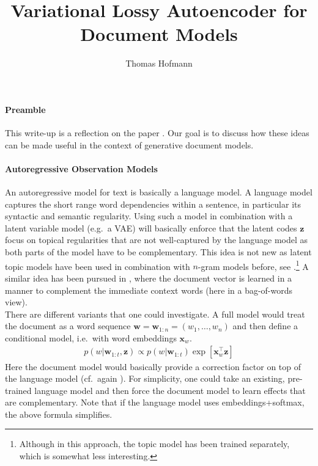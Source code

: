 \documentclass{article}
\title{Variational Lossy Autoencoder for \\ Document Models}
\author{Thomas Hofmann}
\newcommand{\z}{{\mathbf z}}
\newcommand{\x}{{\mathbf x}}
\newcommand{\w}{{\mathbf w}}
\begin{document}
\maketitle

\paragraph*{Preamble} This write-up is a reflection on the paper \cite{chen2016variational}. Our goal is to discuss how these ideas can be made useful in the context of generative document models. 

\paragraph*{Autoregressive Observation Models} 

An autoregressive model for text is basically a language model. A language model captures the short range word dependencies within a sentence, in particular its syntactic and semantic regularity. Using such a model in combination with a latent variable model (e.g.~a VAE) will basically enforce that the latent codes $\z$ focus on topical regularities that are not well-captured by the language model as both parts of the model have to be complementary.  This idea is not new as latent topic models have been used in combination with $n$-gram models before, see \cite{gildea1999topic}.\footnote{Although in this approach, the topic model has been trained separately, which is somewhat less interesting.} A similar idea has been pursued in \cite{le2014distributed}, where the document vector is learned in a manner to complement the immediate context words (here in a bag-of-words view). \\

There are different variants that one could investigate. A full model would treat the document as a word sequence $\w = \w_{1:n} = (w_1, \dots, w_n)$ and then define a conditional model, i.e.~with word embeddings $\x_w$. 
\begin{align}
p(w | \w_{1:t}, \z) \propto p(w | \w_{1:t}) \exp\left[ \x_w^\top \z \right]
\end{align}
Here the document model would basically provide a correction factor on top of the language model (cf.~again \cite{gildea1999topic}).  For simplicity, one could take an existing, pre-trained language model and then force the document model to learn effects that are complementary. Note that if the language model uses  embeddings+softmax, the above formula simplifies. \\
\end{document}
